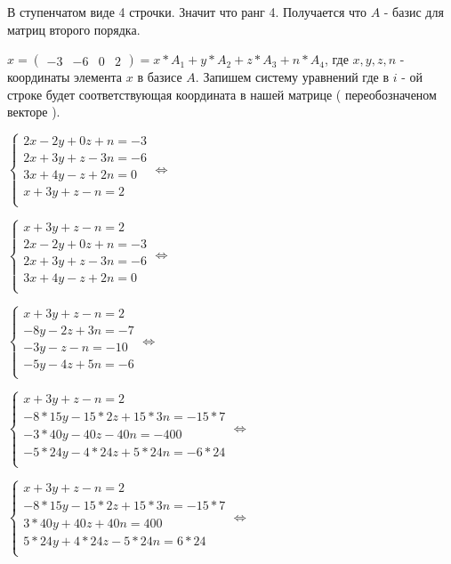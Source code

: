 В ступенчатом виде 4 строчки. Значит что ранг 4. Получается что $A$ - базис для матриц второго порядка.

$x = \begin{pmatrix}-3 & -6 & 0 & 2\end{pmatrix} = x*A_1 + y*A_2 + z*A_3 + n*A_4$,
где $x,y,z,n$ - координаты элемента $x$ в базисе $A$. Запишем систему уравнений где в $i$ - ой строке будет соответствующая координата в нашей матрице ( переобозначеном векторе ).

\begin{multicols}{2}
$ \begin{cases}
2x -2y + 0z + n = -3\\
2x + 3y + z -3n = -6\\
3x + 4y - z + 2n = 0\\
x + 3y + z - n = 2\\
\end{cases} \Longleftrightarrow $

$ \begin{cases}
x + 3y + z - n = 2 \\
2x -2y + 0z + n = -3\\
2x + 3y + z -3n = -6\\
3x + 4y - z + 2n = 0\\
\end{cases} \Longleftrightarrow  $

$ \begin{cases}
x + 3y + z - n = 2 \\
 -8y - 2z + 3n = -7\\
 -3y -z -n = -10\\
  -5y - 4z + 5n = -6\\
\end{cases}  \Longleftrightarrow $

$ \begin{cases}
x + 3y + z - n = 2 \\
 -8*15y - 15*2z + 15*3n = -15*7\\
 -3*40y -40z -40n = -400\\
  -5*24y - 4*24z + 5*24n = -6*24\\
\end{cases}  \Longleftrightarrow $

$ \begin{cases}
x + 3y + z - n = 2 \\
 -8*15y - 15*2z + 15*3n = -15*7\\
 3*40y +40z +40n = 400\\
  5*24y + 4*24z - 5*24n = 6*24\\
\end{cases}  \Longleftrightarrow $


\end{multicols}

